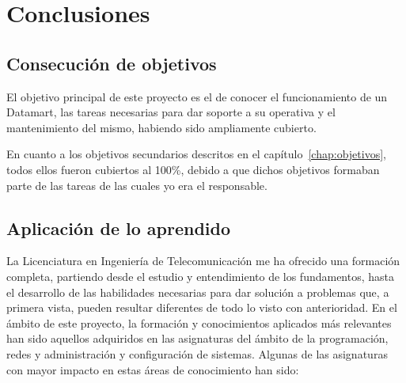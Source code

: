 \documentclass[a4paper, 12pt]{book}
\begin{document}

\cleardoublepage
\chapter{Conclusiones}
\label{chap:conclusiones}

\section{Consecución de objetivos}
\label{sec:consecucion-objetivos}

El objetivo principal de este proyecto es el de conocer el funcionamiento de un Datamart, las tareas necesarias para dar soporte a su operativa y el mantenimiento del mismo, habiendo sido ampliamente cubierto.

En cuanto a los objetivos secundarios descritos en el capítulo~\ref{chap:objetivos}, todos ellos fueron cubiertos al 100\%, debido a que dichos objetivos formaban parte de las tareas de las cuales yo era el responsable.


\section{Aplicación de lo aprendido}
\label{sec:aplicacion}

La Licenciatura en Ingeniería de Telecomunicación me ha ofrecido una formación completa, partiendo desde el estudio y entendimiento de los fundamentos, hasta el desarrollo de las habilidades necesarias para dar solución a problemas que, a primera vista, pueden resultar diferentes de todo lo visto con anterioridad. En el ámbito de este proyecto, la formación y conocimientos aplicados más relevantes han sido aquellos adquiridos en las asignaturas del ámbito de la programación, redes y administración y configuración de sistemas. Algunas de las asignaturas con mayor impacto en estas áreas de conocimiento han sido:
\end{document}
